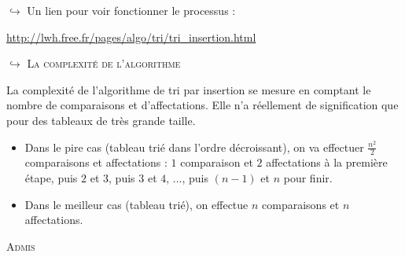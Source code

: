 \documentclass[a4paper,french]{article}
\begin{document}
$ \hookrightarrow$ Un lien pour voir fonctionner le processus : 

\url{http://lwh.free.fr/pages/algo/tri/tri_insertion.html}
\bigskip

$\hookrightarrow$ \textsc{La complexité de l'algorithme}
\medskip


La complexité de l'algorithme de tri par insertion se mesure en comptant le nombre de comparaisons et d'affectations. Elle n'a réellement de signification que pour des tableaux de très grande taille.

\begin{itemize}
\item Dans le pire cas (tableau trié dans l'ordre décroissant), on va effectuer $\displaystyle{\frac{n^2}{2}}$ comparaisons et affectations : $1$ comparaison et $2$ affectations à la première étape, puis $2$ et $3$, puis $3$ et $4$, ..., puis $(n-1)$ et $n$ pour finir.

\item Dans le meilleur cas (tableau trié), on effectue $n$ comparaisons et $n$ affectations.
\end{itemize}
\bigskip

\textsc{Admis}
\\
\end{document}
